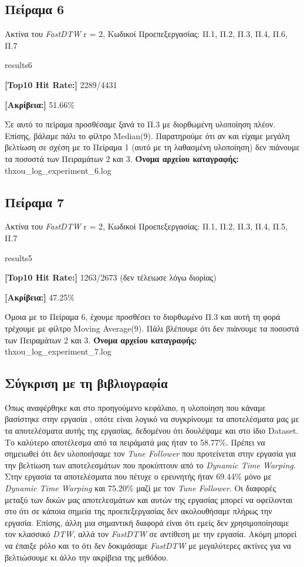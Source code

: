 \subsection{Πείραμα 6}
Ακτίνα του \textit{FastDTW} r = 2, Κωδικοί Προεπεξεργασίας: Π.1, Π.2, Π.3, Π.4, Π.6, Π.7
\begin{labeling}{results6}
	\item \textbf{[Top10 Hit Rate:]} 2289/4431
	\item \textbf{[Ακρίβεια:]} 51.66\%
\end{labeling}
Σε αυτό το πείραμα προσθέσαμε ξανά το Π.3 με διορθωμένη υλοποίηση πλέον. Επίσης, βάλαμε πάλι το φίλτρο Μedian(9). Παρατηρούμε ότι αν και είχαμε μεγάλη βελτίωση σε σχέση με το Πείραμα 1 (αυτό με τη λαθασμένη υλοποίηση) δεν πιάνουμε τα ποσοστά των Πειραμάτων 2 και 3.
\textbf{Όνομα αρχείου καταγραφής:} thxou\_log\_experiment\_6.log

\subsection{Πείραμα 7}
Ακτίνα του \textit{FastDTW} r = 2, Κωδικοί Προεπεξεργασίας: Π.1, Π.2, Π.3, Π.4, Π.5, Π.7
\begin{labeling}{results5}
	\item \textbf{[Top10 Hit Rate:]} 1263/2673 (δεν τέλειωσε λόγω διορίας)
	\item \textbf{[Ακρίβεια:]} 47.25\%
\end{labeling}
Όμοια με το Πείραμα 6, έχουμε προσθέσει το διορθωμένο Π.3 και αυτή τη φορά τρέχουμε με φίλτρο Moving Average(9). Πάλι βλέπουμε ότι δεν πιάνουμε τα ποσοστά των Πειραμάτων 2 και 3.
\textbf{Όνομα αρχείου καταγραφής:} thxou\_log\_experiment\_7.log

\subsection{Σύγκριση με τη βιβλιογραφία}
Όπως αναφέρθηκε και στο προηγούμενο κεφάλαιο, η υλοποίηση που κάναμε βασίστηκε στην εργασία \cite{stasiak2014follow}, οπότε είναι λογικό να συγκρίνουμε τα αποτελέσματα μας με τα αποτελέσματα αυτής της
εργασίας, δεδομένου ότι δουλέψαμε και στο ίδιο Dataset. Το καλύτερο αποτέλεσμα από τα πειράματά μας ήταν το
58.77\%. Πρέπει να σημειωθεί ότι δεν υλοποιήσαμε τον \textit{Tune Follower} που προτείνεται στην εργασία για την
βελτίωση των αποτελεσμάτων που προκύπτουν από το \textit{Dynamic Time Warping}. Στην εργασία τα αποτελέσματα που πέτυχε
ο ερευνητής ήταν 69.44\% μόνο με \textit{Dynamic Time Warping} και 75.20\% μαζί με τον \textit{Tune Follower}. Οι διαφορές
μεταξύ των δικών μας αποτελεσμάτων και αυτών της εργασίας μπορεί να οφείλονται στο ότι σε κάποια σημεία της
προεπεξεργασίας δεν ακολουθήσαμε πλήρως την εργασία. Επίσης, άλλη μια σημαντική
διαφορά είναι ότι εμείς δεν χρησιμοποίησαμε τον κλασσικό \textit{DTW}, αλλά τον \textit{FastDTW} σε αντίθεση με την εργασία.
Ακόμη μπορεί να έπαιξε ρόλο και το ότι δεν δοκιμάσαμε \textit{FastDTW} με μεγαλύτερες ακτίνες για να βελτιώσουμε κι άλλο την ακρίβεια της μεθόδου.